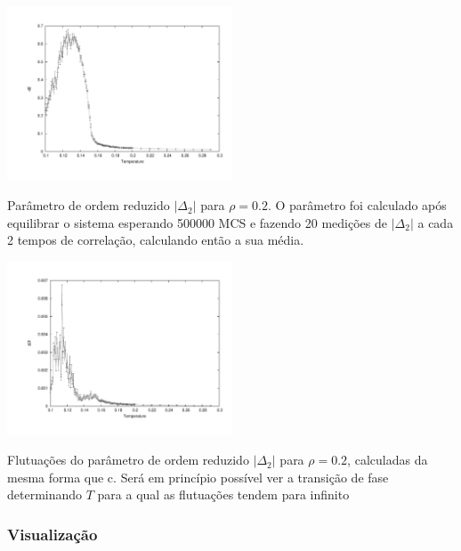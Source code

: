 \documentclass[a4paper,10pt]{article}
\makeatletter
\newenvironment{figurehere}
  {\def\@captype{figure}}
  {}
\makeatother
\begin{document}
\begin{multicols}{2}
\begin{figurehere}
	\centering
		\includegraphics[width=0.5\textwidth, clip, trim = 1.7cm 1.5cm 1cm 1cm]{images/0.2/d2}
	\caption{{\footnotesize Parâmetro de ordem reduzido $|\Delta_2|$ para $\rho = 0.2$. O parâmetro foi calculado após equilibrar o sistema esperando 500000 MCS e fazendo 20 medições de $|\Delta_2|$ a cada 2 tempos de correlação, calculando então a sua média.}}
	\label{fig:19}
\end{figurehere}

\begin{figurehere}
	\centering
		\includegraphics[width=0.5\textwidth, clip, trim = 1.7cm 1.5cm 1cm 1cm]{images/0.2/d2f}
	\caption{{\footnotesize Flutuações do parâmetro de ordem reduzido $|\Delta_2|$ para $\rho = 0.2$, calculadas da mesma forma que c. Será em princípio possível ver a transição de fase determinando $T$ para a qual as flutuações tendem para infinito}}
	\label{fig:20}
\end{figurehere}

\subsubsection{Visualização}


\end{multicols}
\end{document}
